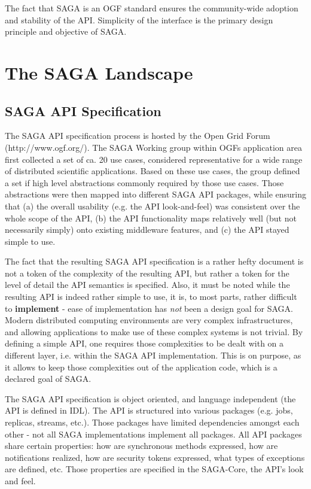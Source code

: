 \documentclass[12pt]{article}
\begin{document}
 The fact that SAGA is an OGF standard ensures the community-wide
 adoption and stability of the API.  %
 Simplicity of the interface is the primary design principle and
 objective of SAGA.


\section{The SAGA Landscape}

 \subsection{SAGA API Specification}

  The SAGA API specification process is hosted by the Open Grid Forum
  (http://www.ogf.org/).  The SAGA Working group within OGFs
  application area first collected a set of ca. 20 use cases,
  considered representative for a wide range of distributed scientific
  applications.  Based on these use cases, the group defined a set if
  high level abstractions commonly required by those use cases.  Those
  abstractions were then mapped into different SAGA API packages,
  while ensuring that (a) the overall usability (e.g. the API
  look-and-feel) was consistent over the whole scope of the API, (b)
  the API functionality maps relatively well (but not necessarily
  simply) onto existing middleware features, and (c) the API stayed
  simple to use.

  The fact that the resulting SAGA API specification is a rather hefty
  document is not a token of the complexity of the resulting API, but
  rather a token for the level of detail the API semantics is
  specified.  Also, it must be noted while the resulting API is indeed
  rather simple to use, it is, to most parts, rather difficult to {\bf
  implement} - ease of implementation has {\it not} been a design goal
  for SAGA.  Modern distributed computing environments are very
  complex infrastructures, and allowing applications to make use of
  these complex systems is not trivial.  By defining a simple API, one
  requires those complexities to be dealt with on a different layer,
  i.e. within the SAGA API implementation. This is on purpose, as it
  allows to keep those complexities out of the application code, which
  is a declared goal of SAGA.

  The SAGA API specification is object oriented, and language
  independent (the API is defined in IDL).  The API is structured into
  various packages (e.g. jobs, replicas, streams, etc.).  Those
  packages have limited dependencies amongst each other - not all SAGA
  implementations implement all packages.  All API packages share
  certain properties: how are synchronous methods expressed, how are
  notifications realized, how are security tokens expressed, what
  types of exceptions are defined, etc.  Those properties are
  specified in the SAGA-Core, the API's look and feel.  
\end{document}
